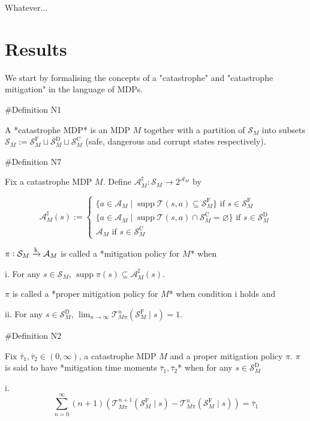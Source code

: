 \documentclass[a4paper]{article}
\newcommand{\Comment}[1]{}
\DeclareMathOperator{\Supp}{supp}
\newcommand{\AP}[1]{\left(#1\right)}
\newcommand{\Nats}{\mathbb{N}}
\newcommand{\M}{\xrightarrow{\textnormal{k}}}
\newcommand{\A}{\mathcal{A}}
\newcommand{\St}{\mathcal{S}}
\newcommand{\T}{\mathcal{T}}
\newcommand{\RMC}{\mathrm{C}}
\newcommand{\RMD}{\mathrm{D}}
\newcommand{\RMF}{\mathrm{F}}
\newcommand{\SF}{\St^{\RMF}}
\newcommand{\SD}{\St^{\RMD}}
\newcommand{\SC}{\St^{\RMC}}
\begin{document}
Whatever...

\section{Results}

We start by formalising the concepts of a "catastrophe" and "catastrophe mitigation" in the language of MDPs.

\#Definition N1

A *catastrophe MDP* is an MDP $M$ together with a partition of $\St_M$ into subsets $\St_M:=\SF_M \sqcup \SD_M \sqcup \SC_M$ (safe, dangerous and corrupt states respectively).

\#Definition N7

Fix a catastrophe MDP $M$. Define $\A_M^\sharp: \St_M \rightarrow 2^{\A_M}$ by

$$\A_M^\sharp(s):=\begin{cases} \{a \in \A_M \mid \Supp{\T(s,a)} \subseteq \SF_M\} \text{ if } s \in \SF_M \\ \{a \in \A_M \mid \Supp{\T(s,a)} \cap \SC_M = \varnothing\} \text{ if } s \in \SD_M \\ \A_M \text{ if } s \in \SC_M \end{cases}$$

$\pi: \St_M \M \A_M$ is called a *mitigation policy for $M$* when 

i. For any $s \in \St_M$, $\Supp{\pi(s)} \subseteq \A_M^\sharp(s)$. 

$\pi$ is called a *proper mitigation policy for $M$* when condition i holds and

ii. For any $s \in \SD_M$, $\lim_{n \rightarrow \infty} \T_{M\pi}^n\AP{\SF_M \mid s} = 1$. 

\Comment{Given $k \in \Nats$, $\pi$ is called a *proper k-mitigation policy for $M$* when conditions i+ii hold and

iii. For any $s \in \St_D$, $\Supp{\pi(s)} \subseteq \A_M^k(s)$.

iv. For any $s \in \St_F$, $\Supp{\pi(s)} \subseteq \A_M^{k+1}(s)$.}

\#Definition N2

Fix $\bar{\tau}_1,\bar{\tau}_2 \in (0,\infty)$, a catastrophe MDP $M$ and a proper mitigation policy $\pi$. $\pi$ is said to have *mitigation time moments $\bar{\tau}_1,\bar{\tau}_2$* when for any $s \in \SD_M$

i. $$\sum_{n=0}^\infty (n+1) \AP{\T_{M\pi}^{n+1}\AP{\SF_M \mid s}-\T_{M\pi}^{n}\AP{\SF_M \mid s}} = \bar{\tau}_1$$
\end{document}
